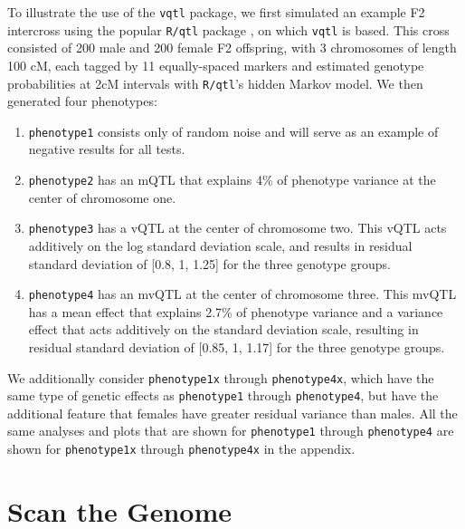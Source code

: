To illustrate the use of the \texttt{vqtl} package, we first simulated an example F2 intercross using the popular \texttt{R/qtl} package \citep{Broman2003}, on which \texttt{vqtl} is based.
This cross consisted of 200 male and 200 female F2 offspring, with 3 chromosomes of length 100 cM, each tagged by 11 equally-spaced markers and estimated genotype probabilities at 2cM intervals with \texttt{R/qtl}'s hidden Markov model. We then generated four phenotypes:
\begin{enumerate}
	\item \texttt{phenotype1} consists only of random noise and will serve as an example of negative results for all tests.
	\item \texttt{phenotype2} has an mQTL that explains 4\% of phenotype variance at the center of chromosome one.
	\item \texttt{phenotype3} has a vQTL at the center of chromosome two.
        This vQTL acts additively on the log standard deviation scale, and results in residual standard deviation of [0.8, 1, 1.25] for the three genotype groups.
	\item \texttt{phenotype4} has an mvQTL at the center of chromosome three.
        This mvQTL has a mean effect that explains 2.7\% of phenotype variance and a variance effect that acts additively on the standard deviation scale, resulting in residual standard deviation of [0.85, 1, 1.17] for the three genotype groups.
\end{enumerate}

We additionally consider \texttt{phenotype1x} through \texttt{phenotype4x}, which have the same type of genetic effects as \texttt{phenotype1} through \texttt{phenotype4}, but have the additional feature that females have greater residual variance than males.
All the same analyses and plots that are shown for \texttt{phenotype1} through \texttt{phenotype4} are shown for \texttt{phenotype1x} through \texttt{phenotype4x} in the appendix.

\section{Scan the Genome}

